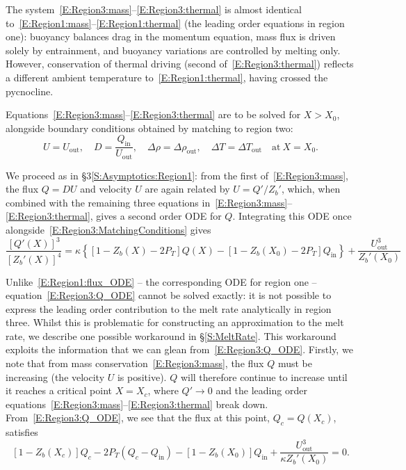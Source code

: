 \documentclass[openacc]{rsproca_new}%
\newcommand{\Pt}{\textit{P}_T}
\renewcommand{\in}{\text{in}} %
\newcommand{\out}{\text{out}}
\begin{document}
The system~\eqref{E:Region3:mass}--\eqref{E:Region3:thermal} is almost identical to~\eqref{E:Region1:mass}--\eqref{E:Region1:thermal} (the leading order equations in region one): buoyancy balances drag in the momentum equation, mass flux is driven solely by entrainment, and buoyancy variations are controlled by melting only. However, conservation of thermal driving (second of~\eqref{E:Region3:thermal}) reflects a different ambient temperature to~\eqref{E:Region1:thermal}, having crossed the pycnocline.

Equations~\eqref{E:Region3:mass}--\eqref{E:Region3:thermal} are to be solved for $X > X_0$, alongside boundary conditions obtained by matching to region two:
\begin{equation}\label{E:Region3:MatchingConditions}
U = U_\out, \quad D = \frac{Q_\in}{U_\out}, \quad \Delta \rho = \Delta \rho_\out, \quad \Delta T = \Delta T_\out \quad \text{at}~X = X_0.
\end{equation}

We proceed as in \S3\ref{S:Asymptotics:Region1}: from the first of~\eqref{E:Region3:mass}, the flux $Q = DU$ and velocity $U$ are again related by $U =Q'/Z_b'$,
which, when combined with the remaining three equations in~\eqref{E:Region3:mass}--\eqref{E:Region3:thermal}, gives a second order ODE for $Q$. Integrating this ODE once alongside~\eqref{E:Region3:MatchingConditions} gives
\begin{equation}\label{E:Region3:Q_ODE}
\frac{\left[Q'(X)\right]^3}{\left[Z_b'(X)\right]^4} = \kappa \left\{ \left[1 - Z_b(X) - 2P_T\right] Q(X) - \left[1 - Z_b(X_0) - 2P_T\right]Q_\text{in}\right\} + \frac{U_\text{out}^3}{Z_b'(X_0)}
\end{equation}

Unlike~\eqref{E:Region1:flux_ODE} -- the corresponding ODE for region one -- equation~\eqref{E:Region3:Q_ODE} cannot be solved exactly: it is not possible to express the leading order contribution to the melt rate analytically in region three. Whilst this is problematic for constructing an approximation to the melt rate, we describe one possible workaround in \S\ref{S:MeltRate}. This workaround exploits the information that we can glean from~\eqref{E:Region3:Q_ODE}. Firstly, we note that from mass conservation~\eqref{E:Region3:mass}, the flux $Q$ must be increasing (the velocity $U$ is positive). $Q$ will therefore continue to increase until it reaches a critical point $X = X_c$, where $Q' \to 0$ and the leading order equations~\eqref{E:Region3:mass}--\eqref{E:Region3:thermal} break down. From~\eqref{E:Region3:Q_ODE}, we see that the flux at this point, $Q_c =Q(X_c)$, satisfies 
\begin{equation}
\left[1 - Z_b(X_c)\right]Q_c - 2\Pt\left(Q_c - Q_\in\right) -\left[1 - Z_b(X_0)\right]Q_\in +  \frac{U_\out^3}{\kappa Z_b'(X_0)} = 0.
\end{equation}
\end{document}
